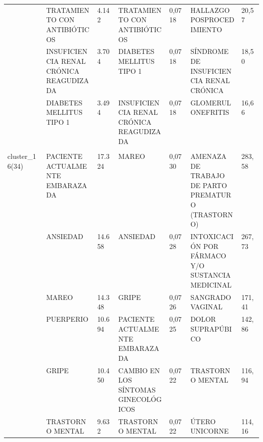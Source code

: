\begin{landscape}
\begin{longtable}[c]{@{}lp{0.2\linewidth}lp{0.2\linewidth}lp{0.2\linewidth}l@{}}
                                  & TRATAMIENTO CON ANTIBIÓTICOS                                  & 4.142  & TRATAMIENTO CON ANTIBIÓTICOS                           & 0,0718 & HALLAZGO POSPROCEDIMIENTO                                     & 20,57    \\
                                  & INSUFICIENCIA RENAL CRÓNICA REAGUDIZADA                       & 3.704  & DIABETES MELLITUS TIPO 1                               & 0,0718 & SÍNDROME DE INSUFICIENCIA RENAL CRÓNICA                       & 18,50    \\
                                  & DIABETES MELLITUS TIPO 1                                      & 3.494  & INSUFICIENCIA RENAL CRÓNICA REAGUDIZADA                & 0,0718 & GLOMERULONEFRITIS                                             & 16,66    \\ \\
\multirow{10}{*}{cluster\_16(34)} & PACIENTE ACTUALMENTE EMBARAZADA                               & 17.324 & MAREO                                                  & 0,0730 & AMENAZA DE TRABAJO DE PARTO PREMATURO (TRASTORNO)             & 283,58   \\
                                  & ANSIEDAD                                                      & 14.658 & ANSIEDAD                                               & 0,0728 & INTOXICACIÓN POR FÁRMACO Y/O SUSTANCIA MEDICINAL              & 267,73   \\
                                  & MAREO                                                         & 14.348 & GRIPE                                                  & 0,0726 & SANGRADO VAGINAL                                              & 171,41   \\
                                  & PUERPERIO                                                     & 10.694 & PACIENTE ACTUALMENTE EMBARAZADA                        & 0,0725 & DOLOR SUPRAPÚBICO                                             & 142,86   \\
                                  & GRIPE                                                         & 10.450 & CAMBIO EN LOS SÍNTOMAS GINECOLÓGICOS                   & 0,0722 & TRASTORNO MENTAL                                              & 116,94   \\
                                  & TRASTORNO MENTAL                                              & 9.632  & TRASTORNO MENTAL                                       & 0,0722 & ÚTERO UNICORNE                                                & 114,16   \\

\end{longtable}
\end{landscape}
